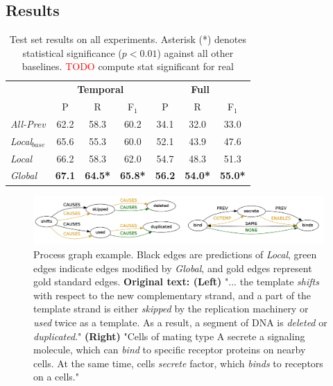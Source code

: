 \subsection{Results} \label{subsec:results}

\begin{table}[t]
{\footnotesize
\begin{tabular}{| l | c | c | c | c | c | c |}
\hline
    & \multicolumn{3}{c|}{\textbf{Temporal}} & \multicolumn{3}{c|}{\textbf{Full}} \\
    & P & R & F$_1$ & P & R & F$_1$ \\
\hline
\hline
\emph{All-Prev} & 62.2 & 58.3 & 60.2 & 34.1 & 32.0 & 33.0 \\
\emph{Local$_{base}$} & 65.6 & 55.3 & 60.0 &  52.1 & 43.9 & 47.6\\
\emph{Local} & 66.2 & 58.3 & 62.0 & 54.7 & 48.3 & 51.3 \\
\emph{Global} & \textbf{67.1} & \textbf{64.5*} & \textbf{65.8*} & \textbf{56.2} & \textbf{54.0*} & \textbf{55.0*} \\
\hline
\end{tabular}}
\caption{Test set results on all experiments. Asterisk (*) denotes statistical significance ($p<0.01$) against all other baselines. \textcolor{red}{TODO} compute stat significant for real}
\label{tab:results}
\end{table}


\begin{figure}[t]
\centering
\includegraphics[width=0.99\textwidth]{figures/example.png} 
\caption{Process graph example. Black edges are predictions of \emph{Local}, green edges indicate edges modified by \emph{Global}, and gold edges represent gold standard edges. \textbf{Original text: (Left)} "... the template \emph{shifts} with respect to the new complementary strand, and a part of the template strand is either \emph{skipped} by the replication machinery or \emph{used} twice as a template.
As a result, a segment of DNA is \emph{deleted} or \emph{duplicated}." \textbf{(Right)} "Cells of mating type A secrete a signaling molecule, which can \emph{bind} to specific receptor proteins on nearby cells. At the same time, cells \emph{secrete} factor, which \emph{binds} to receptors on a cells."}
\label{fig:graph}
\end{figure}

